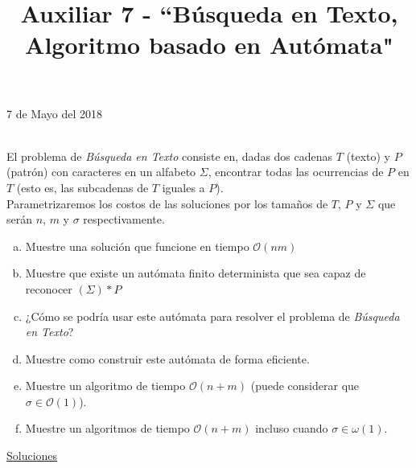 \documentclass[dcc,uchile]{fcfmcourse}
\title{Auxiliar 7 - ``Búsqueda en Texto, Algoritmo basado en Autómata"}
\theoremstyle{plain}
\theoremstyle{definition}
\begin{document}
\maketitle
\begin{center}
7 de Mayo del 2018
\end{center}


\vspace{-1ex}


\begin{problems}
\\
El problema de \textit{Búsqueda en Texto} consiste en, dadas dos cadenas $T$ (texto) y $P$ (patrón) con caracteres en un alfabeto $\Sigma$, encontrar todas las ocurrencias de $P$ en $T$ (esto es, las subcadenas de $T$ iguales a $P$). \\ Parametrizaremos los costos de las soluciones por los tamaños de $T$, $P$ y $\Sigma$ que serán $n$, $m$ y $\sigma$ respectivamente.
\begin{enumerate}[a)]
    \item Muestre una solución que funcione en tiempo $\mathcal{O}(nm)$
    \item Muestre que existe un autómata finito determinista que sea capaz de reconocer $(\Sigma)*P$
    \item ¿Cómo se podría usar este autómata para resolver el problema de \textit{Búsqueda en Texto}?
    \item Muestre como construir este autómata de forma eficiente.
    \item Muestre un algoritmo de tiempo $\mathcal{O}(n+m)$ (puede considerar que $\sigma \in \mathcal{O}(1)$).
    \item Muestre un algoritmos de tiempo $\mathcal{O}(n+m)$ incluso cuando $\sigma \in \omega(1)$.

\end{enumerate}
\end{problems}
\newpage
\begin{center}
{\huge \underline{Soluciones}}
\end{center}
\end{document}

